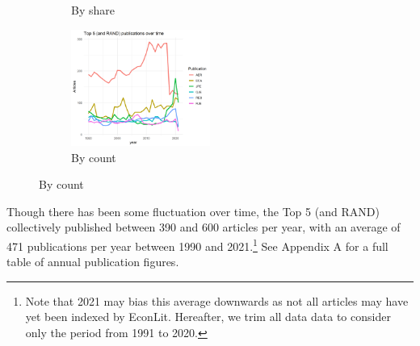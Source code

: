 \documentclass[11pt, letterpaper, twoside]{article}
\begin{document}
\begin{figure}[h]
\begin{subfigure}[h]{0.49\textwidth}
        \caption{By share}
    \end{subfigure}
    \begin{subfigure}[h]{\textwidth}
        \centering
        \includegraphics[width=0.5\textwidth]{top5_over_time.png}
        \caption{By count}
    \end{subfigure}
\end{figure}

Though there has been some fluctuation over time, the Top 5 (and RAND) collectively published between 390 and 600 articles per year, with an average of 471 publications per year between 1990 and 2021.\footnote{Note that 2021 may bias this average downwards as not all articles may have yet been indexed by EconLit. Hereafter, we trim all data data to consider only the period from 1991 to 2020.} See Appendix A for a full table of annual publication figures.
\end{document}
